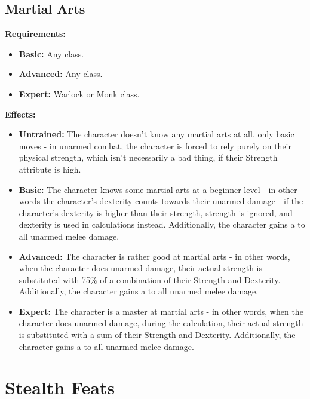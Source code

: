 \documentclass[openany,10pt,a4paper]{book}
\begin{document}
\subsection{Martial Arts}
\begin{table}[!ht]
\centering
{}
\end{table}
\textbf{Requirements:}
\begin{itemize}
	\item \textbf{Basic:} Any class.
	\item \textbf{Advanced:} Any class.
	\item \textbf{Expert:} Warlock or Monk class.
\end{itemize}
\textbf{Effects:}
\begin{itemize}
	\item \textbf{Untrained:} The character doesn't know any martial arts at all, only basic moves  - in unarmed combat, the character is forced to rely purely on their physical strength, which isn't necessarily a bad thing, if their Strength attribute is high.
	\item \textbf{Basic:} The character knows some martial arts at a beginner level - in other words the character's dexterity counts towards their unarmed damage - if the character's dexterity is higher than their strength, strength is ignored, and dexterity is used in calculations instead. Additionally, the character gains a  to all unarmed melee damage.
	\item \textbf{Advanced:} The character is rather good at martial arts - in other words, when the character does unarmed damage, their actual strength is substituted with 75\% of a combination of their Strength and Dexterity. Additionally, the character gains a  to all unarmed melee damage.
	\item \textbf{Expert:} The character is a master at martial arts - in other words, when the character does unarmed damage, during the calculation, their actual strength is substituted with a sum of their Strength and Dexterity. Additionally, the character gains a  to all unarmed melee damage.
\end{itemize}\newpage
\section{Stealth Feats}
\end{document}
